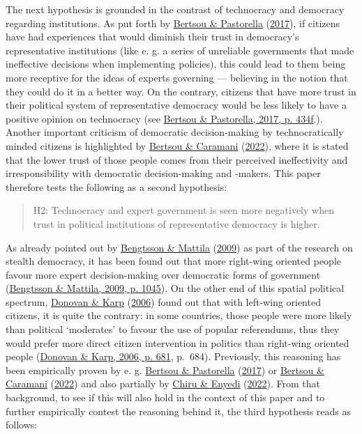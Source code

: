 \documentclass[
  12pt,
  english,
]{article}
\begin{document}
The next hypothesis is grounded in the contrast of technocracy and
democracy regarding institutions. As put forth by
\protect\hyperlink{ref-bertsou2017technocratic}{Bertsou \& Pastorella}
(\protect\hyperlink{ref-bertsou2017technocratic}{2017}), if citizens
have had experiences that would diminish their trust in democracy's
representative institutions (like e. g. a series of unreliable
governments that made ineffective decisions when implementing policies),
this could lead to them being more receptive for the ideas of experts
governing --- believing in the notion that they could do it in a better
way. On the contrary, citizens that have more trust in their political
system of representative democracy would be less likely to have a
positive opinion on technocracy (see
\protect\hyperlink{ref-bertsou2017technocratic}{Bertsou \& Pastorella,
2017, p. 434f}.). Another important criticism of democratic
decision-making by technocratically minded citizens is highlighted by
\protect\hyperlink{ref-bertsou2022people}{Bertsou \& Caramani}
(\protect\hyperlink{ref-bertsou2022people}{2022}), where it is stated
that the lower trust of those people comes from their perceived
ineffectivity and irresponsibility with democratic decision-making and
-makers. This paper therefore tests the following as a second
hypothesis:

\begin{quote}
H2: Technocracy and expert government is seen more negatively when trust
in political institutions of representative democracy is higher.
\end{quote}

As already pointed out by
\protect\hyperlink{ref-bengtsson2009direct}{Bengtsson \& Mattila}
(\protect\hyperlink{ref-bengtsson2009direct}{2009}) as part of the
research on stealth democracy, it has been found out that more
right-wing oriented people favour more expert decision-making over
democratic forms of government
(\protect\hyperlink{ref-bengtsson2009direct}{Bengtsson \& Mattila, 2009,
p. 1045}). On the other end of this spatial political spectrum,
\protect\hyperlink{ref-donovan2006popular}{Donovan \& Karp}
(\protect\hyperlink{ref-donovan2006popular}{2006}) found out that with
left-wing oriented citizens, it is quite the contrary: in some
countries, those people were more likely than political `moderates' to
favour the use of popular referendums, thus they would prefer more
direct citizen intervention in politics than right-wing oriented people
(\protect\hyperlink{ref-donovan2006popular}{Donovan \& Karp, 2006, p.
681}, p.~684). Previously, this reasoning has been empirically proven by
e. g. \protect\hyperlink{ref-bertsou2017technocratic}{Bertsou \&
Pastorella} (\protect\hyperlink{ref-bertsou2017technocratic}{2017}) or
\protect\hyperlink{ref-bertsou2022people}{Bertsou \& Caramani}
(\protect\hyperlink{ref-bertsou2022people}{2022}) and also partially by
\protect\hyperlink{ref-chiru2022wants}{Chiru \& Enyedi}
(\protect\hyperlink{ref-chiru2022wants}{2022}). From that background, to
see if this will also hold in the context of this paper and to further
empirically contest the reasoning behind it, the third hypothesis reads
as follows:
\end{document}
